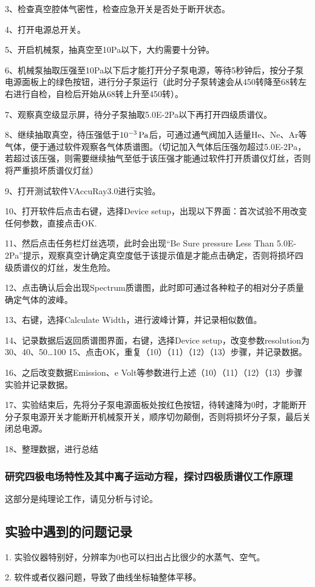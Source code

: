 \documentclass{ctexart}
\begin{document}
3、检查真空腔体气密性，检查应急开关是否处于断开状态。

4、打开电源总开关。

5、开启机械泵，抽真空至10Pa以下，大约需要十分钟。

6、机械泵抽取压强至10Pa以下后才能打开分子泵电源，等待5秒钟后，按分子泵电源面板上的绿色按钮，进行分子泵运行（此时分子泵转速会从450转降至68转左右进行自检，自检后开始从68转上升至450转）。

7、观察真空级显示屏，待分子泵抽取5.0E-2Pa以下再打开四级质谱仪。

8、继续抽取真空，待压强低于$10^{-3}\,\mathrm{Pa}$后，可通过通气阀加入适量He、Ne、Ar等气体，便于通过软件观察各气体质谱图。（切记加入气体后压强勿超过5.0E-2Pa，若超过该压强，则需要继续抽气至低于该压强才能通过软件打开质谱仪灯丝，否则将严重损坏质谱仪灯丝）

9、打开测试软件VAccuRay3.0进行实验。

10、打开软件后点击右键，选择Device setup，出现以下界面：首次试验不用改变任何参数，直接点击OK.

11、然后点击任务栏灯丝选项，此时会出现“Be Sure pressure Less Than 5.0E-2Pa”提示，观察真空计确定真空度低于该提示值是才能点击确定，否则将损坏四级质谱仪的灯丝，发生危险。

12、点击确认后会出现Spectrum质谱图，此时即可通过各种粒子的相对分子质量确定气体的波峰。

13、右键，选择Calculate Width，进行波峰计算，并记录相似数值。

14、记录数据后返回质谱图界面，右键，选择Device setup，改变参数resolution为30、40、50…100
15、点击OK，重复（10）（11）（12）（13）步骤，并记录数据。

16、之后改变数据Emission、e Volt等参数进行上述（10）（11）（12）（13）步骤实验并记录数据。

17、实验结束后，先将分子泵电源面板处按红色按钮，待转速降为0时，才能断开分子泵电源开关才能断开机械泵开关，顺序切勿颠倒，否则将损坏分子泵，最后关闭总电源。

18、整理数据，进行总结

\subsubsection{研究四极电场特性及其中离子运动方程，探讨四极质谱仪工作原理}
这部分是纯理论工作，请见分析与讨论。
\subsection{实验中遇到的问题记录}
\par 1. 实验仪器特别好，分辨率为0也可以扫出占比很少的水蒸气、空气。
\par 2. 软件或者仪器问题，导致了曲线坐标轴整体平移。
\end{document}
